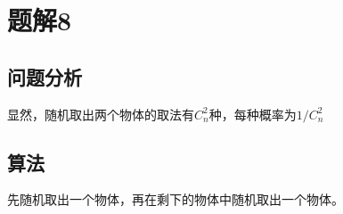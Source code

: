 \section{题解8}
\subsection{问题分析}
显然，随机取出两个物体的取法有$C_n^2$种，每种概率为$1/C_n^2$

\subsection{算法}
先随机取出一个物体，再在剩下的物体中随机取出一个物体。